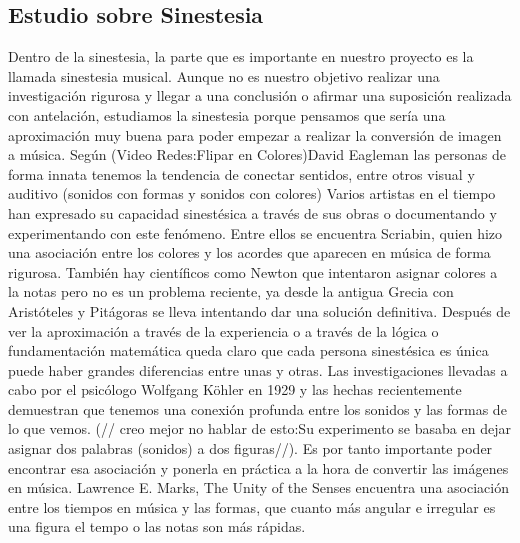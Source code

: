 \subsection{Estudio sobre Sinestesia}

Dentro de la sinestesia, la parte que es importante en nuestro proyecto es la llamada sinestesia musical. Aunque no es nuestro objetivo realizar una investigación rigurosa y llegar a una conclusión o afirmar una suposición realizada con antelación, estudiamos la sinestesia porque pensamos que sería una aproximación muy buena para poder empezar a realizar la conversión de imagen a música.
Según (Video Redes:Flipar en Colores)David Eagleman las personas de forma innata  tenemos la tendencia de conectar sentidos, entre otros visual y auditivo (sonidos con formas y sonidos con colores)
Varios artistas en el tiempo han expresado su capacidad sinestésica a través de sus obras o documentando y experimentando con este fenómeno. Entre ellos se encuentra Scriabin, quien hizo una asociación entre los colores y los acordes que aparecen en música de forma rigurosa. También hay científicos como Newton que intentaron asignar colores a la notas pero no es un problema reciente, ya desde la antigua Grecia con Aristóteles y Pitágoras se lleva intentando dar una solución definitiva. Después de ver la aproximación a través de la experiencia o a través de la lógica o fundamentación matemática queda claro que cada persona sinestésica es única puede haber grandes diferencias entre unas y otras.
Las investigaciones llevadas a cabo por el psicólogo Wolfgang Köhler en 1929 y las hechas recientemente demuestran que tenemos una conexión profunda entre los sonidos y las formas de lo que vemos. (// creo mejor no hablar de esto:Su experimento se basaba en dejar asignar dos palabras (sonidos) a dos figuras//). Es por tanto importante poder encontrar esa asociación y ponerla en práctica a la hora de convertir las imágenes en música. Lawrence E. Marks, The Unity of the Senses encuentra una asociación entre los tiempos en música y las formas, que cuanto más angular e irregular es una figura el tempo o las notas son más rápidas.